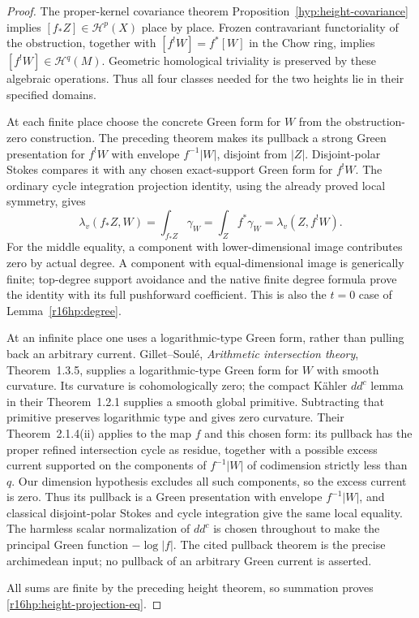 \documentclass[11pt,a4paper]{article}
\theoremstyle{definition}
\theoremstyle{remark}
\numberwithin{equation}{section}
\begin{document}
\begin{proof}
The proper-kernel covariance theorem
Proposition~\ref{hyp:height-covariance} implies
$[f_*Z]\in\mathcal H^p(X)$ place by place. Frozen
contravariant functoriality of the obstruction, together with
$[f^!W]=f^*[W]$ in the Chow ring, implies
$[f^!W]\in\mathcal H^q(M)$. Geometric homological triviality
is preserved by these algebraic operations. Thus all four
classes needed for the two heights lie in their specified domains.

At each finite place choose the concrete Green form for $W$ from
the obstruction-zero construction. The preceding theorem makes its
pullback a strong Green presentation for $f^!W$ with envelope
$f^{-1}|W|$, disjoint from $|Z|$. Disjoint-polar Stokes compares
it with any chosen exact-support Green form for $f^!W$. The
ordinary cycle integration projection identity, using the already
proved local symmetry, gives
\[
 \lambda_v(f_*Z,W)=\int_{f_*Z}\gamma_W
                  =\int_Z f^*\gamma_W
                  =\lambda_v(Z,f^!W).
\]
For the middle equality, a component with lower-dimensional image
contributes zero by actual degree. A component with equal-dimensional
image is generically finite; top-degree support avoidance and the
native finite degree formula prove the identity with its full
pushforward coefficient. This is also the $t=0$ case of
Lemma~\ref{r16hp:degree}.

At an infinite place one uses a logarithmic-type Green form, rather
than pulling back an arbitrary current. Gillet--Soul\'e,
\emph{Arithmetic intersection theory}, Theorem~1.3.5, supplies a
logarithmic-type Green form for $W$ with smooth curvature. Its
curvature is cohomologically zero; the compact K\"ahler
$dd^c$ lemma in their Theorem~1.2.1 supplies a smooth global
primitive. Subtracting that primitive preserves logarithmic type
and gives zero curvature. Their Theorem~2.1.4(ii) applies to the
map $f$ and this chosen form: its pullback has the proper refined
intersection cycle as residue, together with a possible excess
current supported on the components of $f^{-1}|W|$ of codimension
strictly less than $q$. Our dimension hypothesis excludes all such
components, so the excess current is zero. Thus its pullback is a
Green presentation with envelope $f^{-1}|W|$, and classical
disjoint-polar Stokes and cycle integration give the same local
equality. The harmless scalar normalization of $dd^c$ is chosen
throughout to make the principal Green function $-\log|f|$.
The cited pullback theorem is the precise archimedean input;
no pullback of an arbitrary Green current is asserted.

All sums are finite by the preceding height theorem, so summation
proves \eqref{r16hp:height-projection-eq}.
\end{proof}
\end{document}

